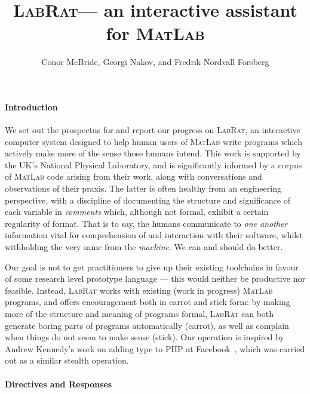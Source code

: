 \documentclass{ws-procs9x6}
\newcommand{\lr}{\textsc{LabRat}}
\newcommand{\ma}{\textsc{MatLab}}
\newcommand{\remph}{\emph}
\begin{document}
\title{\lr --- an interactive assistant for \ma}
\author{Conor McBride, Georgi Nakov, and Fredrik Nordvall Forsberg}
\address{University of Strathclyde}

\bodymatter

\paragraph{Introduction}

We set out the prospectus for and report our progress on \lr, an interactive computer system designed to help human users of \ma{} write programs which actively make more of the sense those humans intend. This work is supported by the UK's National Physical Laboratory, and is significantly informed by a corpus of \ma{} code arising from their work, along with conversations and observations of their praxis. The latter is often healthy from an engineering perspective, with a discipline of documenting the structure and significance of each variable in \remph{comments} which, although not formal, exhibit a certain regularity of format. That is to say, the humans communicate to \remph{one another} information vital for comprehension of and interaction with their software, whilst withholding the very same from the \remph{machine}. We can and should do better.


Our goal is not to get practitioners to give up their existing toolchains in favour of some research level prototype language --- this would neither be productive nor feasible. Instead, \lr{} works with existing (work in progress) \ma{} programs, and offers encouragement both in carrot and stick form: by making more of the structure and meaning of programs formal, \lr{} can both generate boring parts of programs automatically (carrot), as well as complain when things do not seem to make sense (stick). Our operation is inspired by Andrew Kennedy's work on adding type to PHP at Facebook~\cite{hack}, which was carried out as a similar stealth operation.

\paragraph{Directives and Responses}
\end{document}
